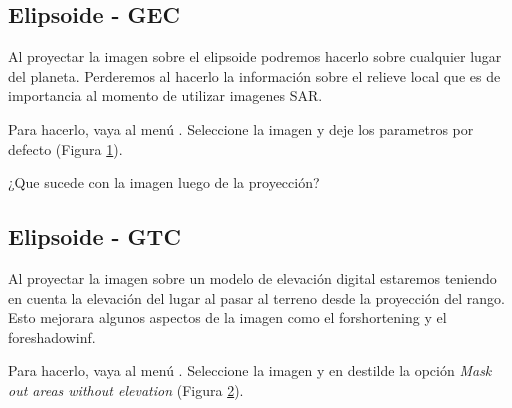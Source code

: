 \subsection{Elipsoide - GEC}

Al proyectar la imagen sobre el elipsoide podremos hacerlo sobre cualquier lugar del planeta. Perderemos al hacerlo la información sobre el relieve local que es de importancia al momento de utilizar imagenes SAR.

Para hacerlo, vaya al menú . Seleccione la imagen  y deje los parametros por defecto (Figura \ref{fig:elipsoide}).

\begin{figure}[h!]
    \centering
    \hfill
    \caption{}
    \label{fig:elipsoide}
\end{figure}

\begin{que}
    ¿Que sucede con la imagen luego de la proyección?
\end{que}

\subsection{Elipsoide - GTC}

Al proyectar la imagen sobre un modelo de elevación digital estaremos teniendo en cuenta la elevación del lugar al pasar al terreno desde la proyección del rango. Esto mejorara algunos aspectos de la imagen como el forshortening y el foreshadowinf.

Para hacerlo, vaya al menú . Seleccione la imagen  y en  destilde la opción \emph{Mask out areas without elevation} (Figura \ref{fig:gtc}).

\begin{figure}[h!]
    \centering
    \hfill
    \caption{}
    \caption{}
    \label{fig:gtc}
\end{figure}

